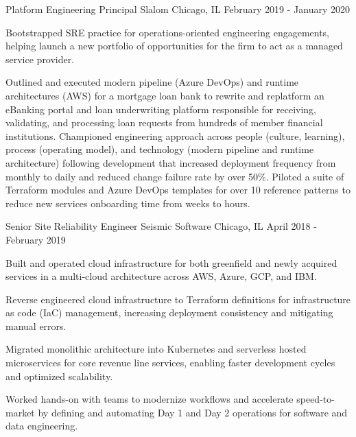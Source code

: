 \begin{cventries}
  \cventry
    {Platform Engineering Principal} %
    {Slalom} %
    {Chicago, IL} %
    {February 2019 - January 2020} %
    {
      \begin{cvitems} %
        \item {Bootstrapped SRE practice for operations-oriented engineering engagements, helping launch a new portfolio of opportunities for the firm to act as a managed service provider.}
        \item {Outlined and executed modern pipeline (Azure DevOps) and runtime architectures (AWS) for a mortgage loan bank to rewrite and replatform an eBanking portal and loan underwriting platform responsible for receiving, validating, and processing loan requests from hundreds of member financial institutions. Championed engineering approach across people (culture, learning), process (operating model), and technology (modern pipeline and runtime architecture) following development that increased deployment frequency from monthly to daily and reduced change failure rate by over 50\%. Piloted a suite of Terraform modules and Azure DevOps templates for over 10 reference patterns to reduce new services onboarding time from weeks to hours.}
      \end{cvitems}
    }

  \cventry
    {Senior Site Reliability Engineer} %
    {Seismic Software} %
    {Chicago, IL} %
    {April 2018 - February 2019} %
    {
      \begin{cvitems} %
        \item {Built and operated cloud infrastructure for both greenfield and newly acquired services in a multi-cloud architecture across AWS, Azure, GCP, and IBM.}
        \item {Reverse engineered cloud infrastructure to Terraform definitions for infrastructure as code (IaC) management, increasing deployment consistency and mitigating manual errors.}
        \item {Migrated monolithic architecture into Kubernetes and serverless hosted microservices for core revenue line services, enabling faster development cycles and optimized scalability.}
        \item {Worked hands-on with teams to modernize workflows and accelerate speed-to-market by defining and automating Day 1 and Day 2 operations for software and data engineering.}
      \end{cvitems}
    }


\end{cventries}
